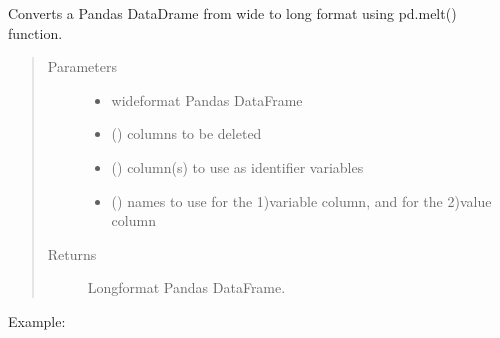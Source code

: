 \documentclass[letterpaper,10pt,english]{sphinxmanual}
\begin{document}
\begin{fulllineitems}
\label{\detokenize{_autosummary/analytics_core.analytics:analytics_core.analytics.analytics.transform_into_long_format}}
Converts a Pandas DataDrame from wide to long format using pd.melt() 
function.
\begin{quote}\begin{description}
\item[{Parameters}] \leavevmode\begin{itemize}
\item {} 
 \textendash{} wide\sphinxhyphen{}format Pandas DataFrame

\item {} 
 () \textendash{} columns to be deleted

\item {} 
 () \textendash{} column(s) to use as identifier variables

\item {} 
 () \textendash{} names to use for the 1)variable column, and for the 2)value column

\end{itemize}

\item[{Returns}] \leavevmode
Long\sphinxhyphen{}format Pandas DataFrame.

\end{description}\end{quote}

Example:


\end{fulllineitems}
\end{document}
